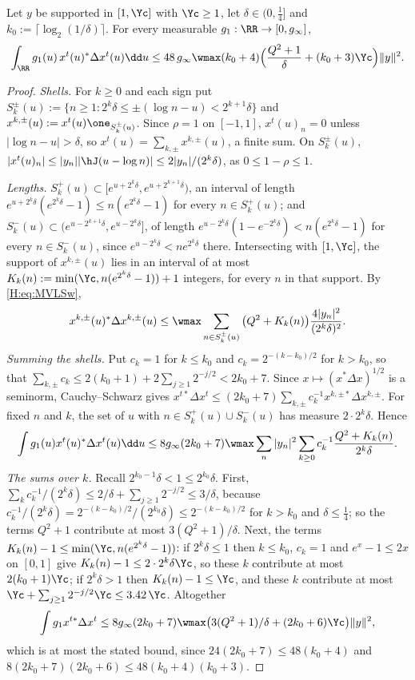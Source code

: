 \begin{lemma}\label{H:lem:M3prime}
Let $y$ be supported in $[1,\Yc]$ with $\Yc\ge1$, let $\delta\in(0,\frac14]$ and $k_0:=\lceil\log_2(1/\delta)\rceil$. For every measurable $g_1:\RR\to[0,g_\infty]$,
\[
\int_\RR g_1(u)\,x^t(u)^*\Delta x^t(u)\dd u\le48\,g_\infty\wmax(k_0+4)\Big(\frac{Q^2+1}\delta+(k_0+3)\Yc\Big)\|y\|^2 .
\]
\end{lemma}
\begin{proof}
\emph{Shells.} For $k\ge0$ and each sign put $S_k^\pm(u):=\{n\ge1:2^k\delta\le\pm(\log n-u)<2^{k+1}\delta\}$ and $x^{k,\pm}(u):=x^t(u)\one_{S_k^\pm(u)}$. Since $\rho=1$ on $[-1,1]$, $x^t(u)_n=0$ unless $|\log n-u|>\delta$, so $x^t(u)=\sum_{k,\pm}x^{k,\pm}(u)$, a finite sum. On $S_k^\pm(u)$, $|x^t(u)_n|\le|y_n||\hJ(u-\log n)|\le2|y_n|/(2^k\delta)$, as $0\le1-\rho\le1$.

\emph{Lengths.} $S_k^+(u)\subset[e^{u+2^k\delta},e^{u+2^{k+1}\delta})$, an interval of length $e^{u+2^k\delta}(e^{2^k\delta}-1)\le n(e^{2^k\delta}-1)$ for every $n\in S_k^+(u)$; and $S_k^-(u)\subset(e^{u-2^{k+1}\delta},e^{u-2^k\delta}]$, of length $e^{u-2^k\delta}(1-e^{-2^k\delta})<n(e^{2^k\delta}-1)$ for every $n\in S_k^-(u)$, since $e^{u-2^k\delta}<ne^{2^k\delta}$ there. Intersecting with $[1,\Yc]$, the support of $x^{k,\pm}(u)$ lies in an interval of at most $K_k(n):=\min(\Yc,n(e^{2^k\delta}-1))+1$ integers, for every $n$ in that support. By \eqref{H:eq:MVLSw},
\[
x^{k,\pm}(u)^*\Delta x^{k,\pm}(u)\le\wmax\sum_{n\in S_k^\pm(u)}\big(Q^2+K_k(n)\big)\frac{4|y_n|^2}{(2^k\delta)^2}.
\]
\emph{Summing the shells.} Put $c_k=1$ for $k\le k_0$ and $c_k=2^{-(k-k_0)/2}$ for $k>k_0$, so that $\sum_{k,\pm}c_k\le2(k_0+1)+2\sum_{j\ge1}2^{-j/2}<2k_0+7$. Since $x\mapsto(x^*\Delta x)^{1/2}$ is a seminorm, Cauchy--Schwarz gives $x^{t*}\Delta x^t\le(2k_0+7)\sum_{k,\pm}c_k^{-1}x^{k,\pm*}\Delta x^{k,\pm}$. For fixed $n$ and $k$, the set of $u$ with $n\in S_k^+(u)\cup S_k^-(u)$ has measure $2\cdot2^k\delta$. Hence
\[
\int g_1(u)x^t(u)^*\Delta x^t(u)\dd u\le8g_\infty(2k_0+7)\wmax\sum_n|y_n|^2\sum_{k\ge0}c_k^{-1}\frac{Q^2+K_k(n)}{2^k\delta}.
\]
\emph{The sums over $k$.} Recall $2^{k_0-1}\delta<1\le2^{k_0}\delta$. First, $\sum_kc_k^{-1}/(2^k\delta)\le2/\delta+\sum_{j\ge1}2^{-j/2}\le3/\delta$, because $c_k^{-1}/(2^k\delta)=2^{-(k-k_0)/2}/(2^{k_0}\delta)\le2^{-(k-k_0)/2}$ for $k>k_0$ and $\delta\le\frac14$; so the terms $Q^2+1$ contribute at most $3(Q^2+1)/\delta$. Next, the terms $K_k(n)-1\le\min(\Yc,n(e^{2^k\delta}-1))$: if $2^k\delta\le1$ then $k\le k_0$, $c_k=1$ and $e^x-1\le2x$ on $[0,1]$ give $K_k(n)-1\le2\cdot2^k\delta\Yc$, so these $k$ contribute at most $2(k_0+1)\Yc$; if $2^k\delta>1$ then $K_k(n)-1\le\Yc$, and these $k$ contribute at most $\Yc+\sum_{j\ge1}2^{-j/2}\Yc\le3.42\,\Yc$. Altogether
\[
\int g_1x^{t*}\Delta x^t\le8g_\infty(2k_0+7)\wmax\big(3(Q^2+1)/\delta+(2k_0+6)\Yc\big)\|y\|^2,
\]
which is at most the stated bound, since $24(2k_0+7)\le48(k_0+4)$ and $8(2k_0+7)(2k_0+6)\le48(k_0+4)(k_0+3)$.
\end{proof}

